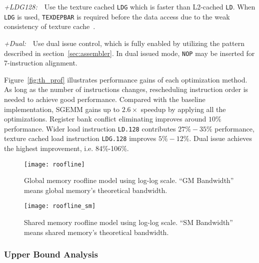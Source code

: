 {\it +LDG128:}~~Use the texture cached {\tt LDG} which is faster than L2-cached {\tt LD}. 
When {\tt LDG} is used, {\tt TEXDEPBAR} is required before the data access due to the weak consistency of texture cache~\cite{lukyanov2014efficient}.

{\it +Dual:}~~Use dual issue control, which is fully enabled by utilizing the pattern described in section~\ref{sec:assembler}.
In dual issued mode, {\tt NOP} may be inserted for 7-instruction alignment.

Figure~\ref{fig:th_prof} illustrates performance gains of each optimization method.
As long as the number of instructions changes, rescheduling instruction order is needed to achieve good performance.
Compared with the baseline implementation, SGEMM gains up to $2.6\times$ speedup by applying all the optimizations.
Register bank conflict eliminating improves around $10\%$ performance. 
Wider load instruction {\tt LD.128} contributes $27\%-35\%$ performance, texture cached
load instruction {\tt LDG.128} improves $5\%-12\%$.
Dual issue achieves the highest improvement, i.e. 84\%-106\%.


\begin{figure}[htbp]
\begin{center}
\texttt{[image: roofline]}
    \caption{Global memory roofline model using log-log scale. ``GM Bandwidth'' means global memory's theoretical
    bandwidth.} %
\label{fig:roofline_global}
\end{center}
\end{figure}

\begin{figure}[htbp]
\begin{center}
\texttt{[image: roofline\_sm]}
    \caption{Shared memory roofline model using log-log scale. ``SM Bandwidth'' means shared memory's theoretical
    bandwidth. }%
\label{fig:roofline_shared}
\end{center}
\end{figure}

\subsubsection{Upper Bound Analysis}


